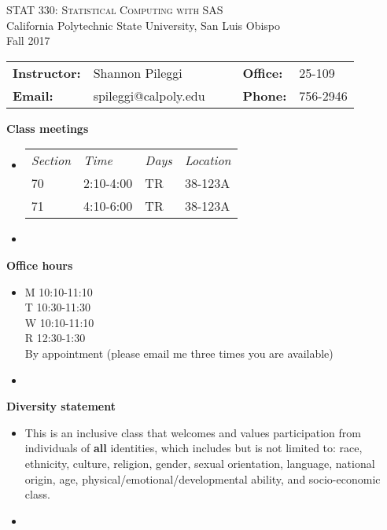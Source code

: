 \documentclass[letterpaper,12pt]{report}
\begin{document}
\begin{center}
\large{\textsc{STAT 330: Statistical Computing with SAS}}\\
California Polytechnic State University, San Luis Obispo\\
Fall 2017\\
\end{center}
\vskip10pt
\begin{center}
{\renewcommand{\arraystretch}{1.5}
\begin{tabular}{llllll}
\hline
\textbf{Instructor:} & Shannon Pileggi       &&& \textbf{Office:} & 25-109 \\
\textbf{Email:}      & spileggi@calpoly.edu  &&& \textbf{Phone:} & 756-2946 \\
\hline
\end{tabular}}
\end{center}

\vskip15pt

\textbf{Class meetings}
\begin{itemize}
\item[]
\begin{tabular}{llll}
\emph{Section}       & \emph{Time}       & \emph{Days} &  \emph{Location} \\
 70 & 2:10-4:00  & TR & 38-123A \\
 71 & 4:10-6:00  & TR & 38-123A \\
\end{tabular}
\item[]
\end{itemize}

\textbf{Office hours}
\begin{itemize}
\item[] M 10:10-11:10 \\ T \hspace{0.1ex} 10:30-11:30 \\ W 10:10-11:10 \\ R \hspace{0.1ex} 12:30-1:30 \\ By appointment (please email me three times you are available)
\item[]
\end{itemize}

\textbf{Diversity statement}
\begin{itemize}
\item[] This is an inclusive class that welcomes and values participation from individuals of \textbf{all} identities, which includes but is not limited to: race, ethnicity, culture, religion, gender, sexual orientation, language, national origin, age, physical/emotional/developmental ability, and socio-economic class.
\item[]
\end{itemize}
\end{document}

